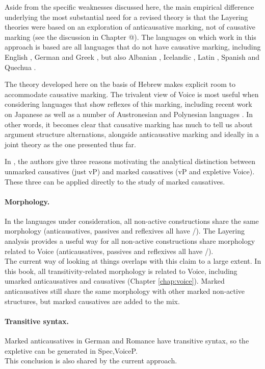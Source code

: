 Aside from the specific weaknesses discussed here, the main empirical difference underlying the most substantial need for a revised theory is that the Layering theories were based on an exploration of anticausative marking, not of causative marking (see the discussion in Chapter @). The languages on which work in this approach is based are all languages that do not have causative marking, including English \citep{myler16mit}, German \citep{schaefer17oup} and Greek \citep{spathasetal15}, but also Albanian \citep{kallulli13}, Icelandic \cite{wood15springer}, Latin \citep{embick04,kastnerzu17}, Spanish \citep{schaefervivanco16} and Quechua \citep{myler16mit}.

The theory developed here on the basis of Hebrew makes explicit room to accommodate causative marking. The trivalent view of Voice is most useful when considering languages that show reflexes of this marking, including recent work on Japanese \citep{oseki17nyu} as well as a number of Austronesian and Polynesian languages \citep{nie17}. In other words, it becomes clear that causative marking has much to tell us about argument structure alternations, alongside anticausative marking and ideally in a joint theory as the one presented thus far.

In \citet[99--100]{layering15}, the authors give three reasons motivating the analytical distinction between unmarked causatives (just vP) and marked causatives (vP and expletive Voice). These three can be applied directly to the study of marked causatives.

\paragraph*{Morphology.} In the languages under consideration, all non-active constructions share the same morphology (anticausatives, passives and reflexives all have /). The Layering analysis provides a useful way for all non-active constructions share morphology related to Voice (anticausatives, passives and reflexives all have /).\\
	The current way of looking at things overlaps with this claim to a large extent. In this book, all transitivity-related morphology is related to Voice, including umarked anticausatives and causatives (Chapter \ref{chap:voice}). Marked anticausatives still share the same morphology with other marked non-active structures, but marked causatives are added to the mix.

\paragraph*{Transitive syntax.} Marked anticausatives in German and Romance have transitive syntax, so the expletive can be generated in Spec,VoiceP.\\
	This conclusion is also shared by the current approach.
	
